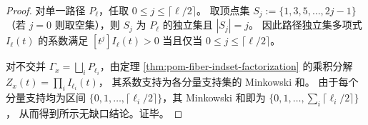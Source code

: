 \begin{proof}
对单一路径 \(P_{\ell}\)，任取 \(0\le j\le \lceil \ell/2\rceil\)。
取顶点集
\(
S_j:=\{1,3,5,\dots,2j-1\}
\)
（若 \(j=0\) 则取空集），则 \(S_j\) 为 \(P_\ell\) 的独立集且 \(|S_j|=j\)。
因此路径独立集多项式 \(I_\ell(t)\) 的系数满足
\(
[t^j]I_\ell(t)>0
\)
当且仅当 \(0\le j\le \lceil \ell/2\rceil\)。
\par
对不交并 \(\Gamma_x=\bigsqcup_i P_{\ell_i}\)，由定理 \ref{thm:pom-fiber-indset-factorization} 的乘积分解
\(
Z_x(t)=\prod_i I_{\ell_i}(t)
\)，
其系数支持为各分量支持集的 Minkowski 和。
由于每个分量支持均为区间 \(\{0,1,\dots,\lceil \ell_i/2\rceil\}\)，其 Minkowski 和即为
\(
\{0,1,\dots,\sum_i\lceil \ell_i/2\rceil\}
\)，
从而得到所示无缺口结论。证毕。
\end{proof}

\endinput
